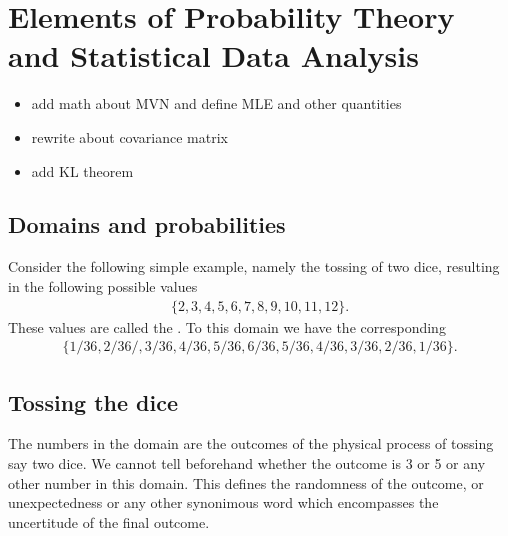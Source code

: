 \documentclass[letterpaper,10pt,english]{sphinxmanual}
\begin{document}
\section{Elements of Probability Theory and Statistical Data Analysis}
\label{\detokenize{chapter2:elements-of-probability-theory-and-statistical-data-analysis}}\label{\detokenize{chapter2::doc}}\begin{itemize}
\item {} 
add math about MVN and define MLE and other quantities

\item {} 
rewrite about covariance matrix

\item {} 
add KL theorem

\end{itemize}


\subsection{Domains and probabilities}
\label{\detokenize{chapter2:domains-and-probabilities}}
Consider the following simple example, namely the tossing of two dice, resulting in  the following possible values
\begin{equation*}
\begin{split}
\{2,3,4,5,6,7,8,9,10,11,12\}.
\end{split}
\end{equation*}
These values are called the .
To this domain we have the corresponding 
\begin{equation*}
\begin{split}
\{1/36,2/36/,3/36,4/36,5/36,6/36,5/36,4/36,3/36,2/36,1/36\}.
\end{split}
\end{equation*}

\subsection{Tossing  the dice}
\label{\detokenize{chapter2:tossing-the-dice}}
The numbers in the domain are the outcomes of the physical process of tossing say two dice.
We cannot tell beforehand whether the outcome is 3 or 5 or any other number in this domain.
This defines the randomness of the outcome, or unexpectedness or any other synonimous word which
encompasses the uncertitude of the final outcome.
\end{document}
